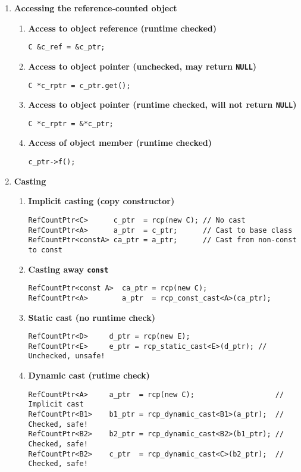 \begin{enumerate}
\item {\bf Accessing the reference-counted object}
%
\begin{enumerate}
%
\item {\bf Access to object reference (runtime checked)}
%
{\small\begin{verbatim}
C &c_ref = &c_ptr;
\end{verbatim}}
%
\item {\bf Access to object pointer (unchecked, may return \texttt{NULL})}
%
{\small\begin{verbatim}
C *c_rptr = c_ptr.get();
\end{verbatim}}
%
\item {\bf Access to object pointer (runtime checked, will not return \texttt{NULL})}
%
{\small\begin{verbatim}
C *c_rptr = &*c_ptr;
\end{verbatim}}
%
\item {\bf Access of object member (runtime checked)}
%
{\small\begin{verbatim}
c_ptr->f();
\end{verbatim}}
%
\end{enumerate}

\item {\bf Casting}
%
\begin{enumerate}
%
\item {\bf Implicit casting (copy constructor)}
%
{\small\begin{verbatim}
RefCountPtr<C>      c_ptr  = rcp(new C); // No cast
RefCountPtr<A>      a_ptr  = c_ptr;      // Cast to base class
RefCountPtr<constA> ca_ptr = a_ptr;      // Cast from non-const to const
\end{verbatim}}
%
\item {\bf Casting away \texttt{const}}
%
{\small\begin{verbatim}
RefCountPtr<const A>  ca_ptr = rcp(new C);
RefCountPtr<A>        a_ptr  = rcp_const_cast<A>(ca_ptr);
\end{verbatim}}
%
\item {\bf Static cast (no runtime check)}
%
{\small\begin{verbatim}
RefCountPtr<D>     d_ptr = rcp(new E);
RefCountPtr<E>     e_ptr = rcp_static_cast<E>(d_ptr); // Unchecked, unsafe!
\end{verbatim}}
%
\item {\bf Dynamic cast (rutime check)}
%
{\small\begin{verbatim}
RefCountPtr<A>     a_ptr  = rcp(new C);                   // Implicit cast
RefCountPtr<B1>    b1_ptr = rcp_dynamic_cast<B1>(a_ptr);  // Checked, safe!
RefCountPtr<B2>    b2_ptr = rcp_dynamic_cast<B2>(b1_ptr); // Checked, safe!
RefCountPtr<B2>    c_ptr  = rcp_dynamic_cast<C>(b2_ptr);  // Checked, safe!
\end{verbatim}}
%
\end{enumerate}


\end{enumerate}
